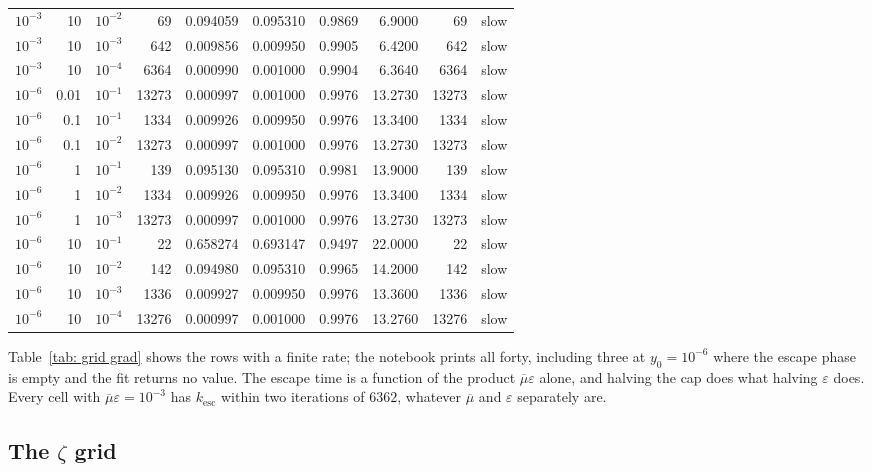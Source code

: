 \documentclass[11pt,a4paper]{article}
\theoremstyle{definition}
\theoremstyle{remark}
\begin{document}
\begin{table}[H]
\begin{tabular}{rrrrrrrrrl}
    $10^{-3}$ & 10   & $10^{-2}$ & 69    & 0.094059 & 0.095310 & 0.9869 & 6.9000 & 69    & slow \\
    $10^{-3}$ & 10   & $10^{-3}$ & 642   & 0.009856 & 0.009950 & 0.9905 & 6.4200 & 642   & slow \\
    $10^{-3}$ & 10   & $10^{-4}$ & 6364  & 0.000990 & 0.001000 & 0.9904 & 6.3640 & 6364  & slow \\
    \midrule
    $10^{-6}$ & 0.01 & $10^{-1}$ & 13273 & 0.000997 & 0.001000 & 0.9976 & 13.2730 & 13273 & slow \\
    $10^{-6}$ & 0.1  & $10^{-1}$ & 1334  & 0.009926 & 0.009950 & 0.9976 & 13.3400 & 1334  & slow \\
    $10^{-6}$ & 0.1  & $10^{-2}$ & 13273 & 0.000997 & 0.001000 & 0.9976 & 13.2730 & 13273 & slow \\
    $10^{-6}$ & 1    & $10^{-1}$ & 139   & 0.095130 & 0.095310 & 0.9981 & 13.9000 & 139   & slow \\
    $10^{-6}$ & 1    & $10^{-2}$ & 1334  & 0.009926 & 0.009950 & 0.9976 & 13.3400 & 1334  & slow \\
    $10^{-6}$ & 1    & $10^{-3}$ & 13273 & 0.000997 & 0.001000 & 0.9976 & 13.2730 & 13273 & slow \\
    $10^{-6}$ & 10   & $10^{-1}$ & 22    & 0.658274 & 0.693147 & 0.9497 & 22.0000 & 22    & slow \\
    $10^{-6}$ & 10   & $10^{-2}$ & 142   & 0.094980 & 0.095310 & 0.9965 & 14.2000 & 142   & slow \\
    $10^{-6}$ & 10   & $10^{-3}$ & 1336  & 0.009927 & 0.009950 & 0.9976 & 13.3600 & 1336  & slow \\
    $10^{-6}$ & 10   & $10^{-4}$ & 13276 & 0.000997 & 0.001000 & 0.9976 & 13.2760 & 13276 & slow \\
    \bottomrule
  \end{tabular}
\end{table}

Table~\ref{tab: grid grad} shows the rows with a finite rate; the notebook prints
all forty, including three at $y_0 = 10^{-6}$ where the escape phase is empty and
the fit returns no value. The escape time is a function of the product
$\overline{\mu}\varepsilon$ alone, and halving the cap does what halving
$\varepsilon$ does. Every cell with $\overline{\mu}\varepsilon = 10^{-3}$ has
$k_{\mathrm{esc}}$ within two iterations of $6362$, whatever $\overline{\mu}$ and
$\varepsilon$ separately are.

\subsection{The \texorpdfstring{$\zeta$}{zeta} grid}
\end{document}
